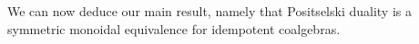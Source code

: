 




We can now deduce our main result, namely that Positselski duality is a symmetric monoidal equivalence for idempotent coalgebras. 

